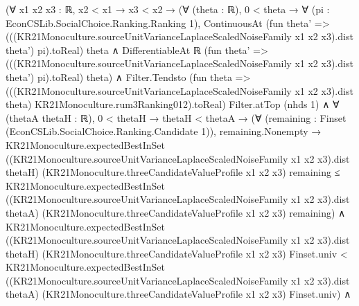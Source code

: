 \documentclass[10pt]{article}
\begin{document}
\begin{ReviewVerbatim}
          (∀ {x1 x2 x3 : ℝ},
              x2 < x1 →
                x3 < x2 →
                  (∀ (theta : ℝ),
                      0 < theta →
                        ∀ (pi : EconCSLib.SocialChoice.Ranking.Ranking 1),
                          ContinuousAt
                              (fun theta' =>
                                (((KR21Monoculture.sourceUnitVarianceLaplaceScaledNoiseFamily x1 x2 x3).dist theta')
                                    pi).toReal)
                              theta ∧
                            DifferentiableAt ℝ
                              (fun theta' =>
                                (((KR21Monoculture.sourceUnitVarianceLaplaceScaledNoiseFamily x1 x2 x3).dist theta')
                                    pi).toReal)
                              theta) ∧
                    Filter.Tendsto
                        (fun theta =>
                          (((KR21Monoculture.sourceUnitVarianceLaplaceScaledNoiseFamily x1 x2 x3).dist theta)
                              KR21Monoculture.rum3Ranking012).toReal)
                        Filter.atTop (nhds 1) ∧
                      ∀ (thetaA thetaH : ℝ),
                        0 < thetaH →
                          thetaH < thetaA →
                            (∀ (remaining : Finset (EconCSLib.SocialChoice.Ranking.Candidate 1)),
                                remaining.Nonempty →
                                  KR21Monoculture.expectedBestInSet
                                      ((KR21Monoculture.sourceUnitVarianceLaplaceScaledNoiseFamily x1 x2 x3).dist
                                        thetaH)
                                      (KR21Monoculture.threeCandidateValueProfile x1 x2 x3) remaining ≤
                                    KR21Monoculture.expectedBestInSet
                                      ((KR21Monoculture.sourceUnitVarianceLaplaceScaledNoiseFamily x1 x2 x3).dist
                                        thetaA)
                                      (KR21Monoculture.threeCandidateValueProfile x1 x2 x3) remaining) ∧
                              KR21Monoculture.expectedBestInSet
                                  ((KR21Monoculture.sourceUnitVarianceLaplaceScaledNoiseFamily x1 x2 x3).dist thetaH)
                                  (KR21Monoculture.threeCandidateValueProfile x1 x2 x3) Finset.univ <
                                KR21Monoculture.expectedBestInSet
                                  ((KR21Monoculture.sourceUnitVarianceLaplaceScaledNoiseFamily x1 x2 x3).dist thetaA)
                                  (KR21Monoculture.threeCandidateValueProfile x1 x2 x3) Finset.univ) ∧

\end{ReviewVerbatim}
\end{document}
